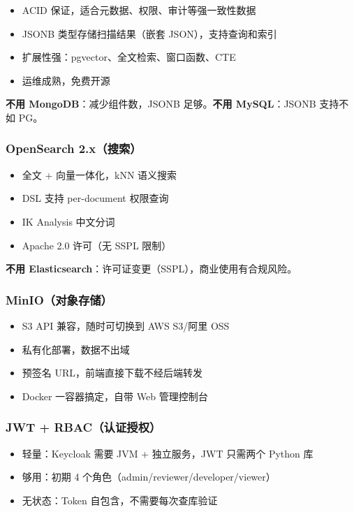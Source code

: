 \documentclass[11pt,a4paper]{article}
\begin{document}
\begin{itemize}[nosep]
  \item ACID 保证，适合元数据、权限、审计等强一致性数据
  \item JSONB 类型存储扫描结果（嵌套 JSON），支持查询和索引
  \item 扩展性强：pgvector、全文检索、窗口函数、CTE
  \item 运维成熟，免费开源
\end{itemize}

\textbf{不用 MongoDB}：减少组件数，JSONB 足够。\textbf{不用 MySQL}：JSONB 支持不如 PG。

\subsubsection{OpenSearch 2.x（搜索）}

\begin{itemize}[nosep]
  \item 全文 + 向量一体化，kNN 语义搜索
  \item DSL 支持 per-document 权限查询
  \item IK Analysis 中文分词
  \item Apache 2.0 许可（无 SSPL 限制）
\end{itemize}

\textbf{不用 Elasticsearch}：许可证变更（SSPL），商业使用有合规风险。

\subsubsection{MinIO（对象存储）}

\begin{itemize}[nosep]
  \item S3 API 兼容，随时可切换到 AWS S3/阿里 OSS
  \item 私有化部署，数据不出域
  \item 预签名 URL，前端直接下载不经后端转发
  \item Docker 一容器搞定，自带 Web 管理控制台
\end{itemize}

\subsubsection{JWT + RBAC（认证授权）}

\begin{itemize}[nosep]
  \item 轻量：Keycloak 需要 JVM + 独立服务，JWT 只需两个 Python 库
  \item 够用：初期 4 个角色（admin/reviewer/developer/viewer）
  \item 无状态：Token 自包含，不需要每次查库验证
\end{itemize}
\end{document}
